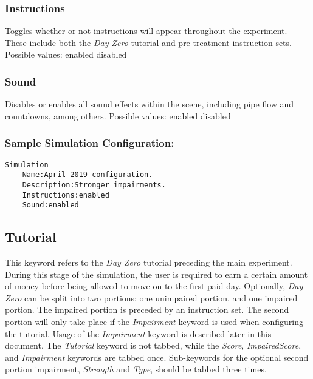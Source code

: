 \documentclass{article}
\begin{document}
\subsubsection{Instructions} Toggles whether or not instructions will appear throughout the experiment. These include both the \textit{Day Zero} tutorial and pre-treatment instruction sets.
\newline \indent Possible values: \newline
\indent\indent enabled \newline
\indent\indent disabled

\subsubsection{Sound} Disables or enables all sound effects within the scene, including pipe flow and countdowns, among others.
\newline \indent Possible values: \newline
\indent\indent enabled \newline
\indent\indent disabled

\subsubsection{Sample Simulation Configuration:}
\begin{lstlisting}
Simulation
    Name:April 2019 configuration.
    Description:Stronger impairments.
    Instructions:enabled
    Sound:enabled
\end{lstlisting} 

\subsection{Tutorial}
This keyword refers to the \textit{Day Zero} tutorial preceding the main experiment. During this stage of the simulation, the user is required to earn a certain amount of money before being allowed to move on to the first paid day. Optionally, \textit{Day Zero} can be split into two portions: one unimpaired portion, and one impaired portion. The impaired portion is preceded by an instruction set. The second portion will only take place if the \textit{Impairment} keyword is used when configuring the tutorial. Usage of the \textit{Impairment} keyword is described later in this document. The \textit{Tutorial} keyword is not tabbed, while the \textit{Score}, \textit{ImpairedScore}, and \textit{Impairment} keywords are tabbed once. Sub-keywords for the optional second portion impairment, \textit{Strength} and \textit{Type}, should be tabbed three times.
\end{document}
